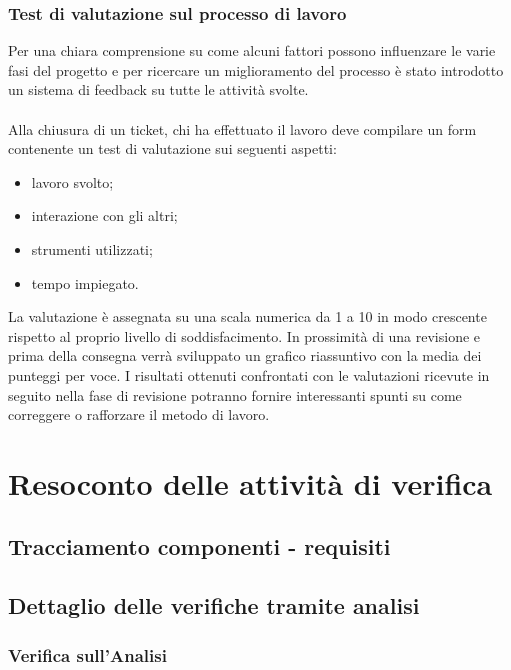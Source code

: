 \subsection{Test di valutazione sul processo di lavoro}
Per una chiara comprensione su come alcuni fattori possono influenzare le varie
fasi del progetto e per ricercare un miglioramento del processo \`e
stato introdotto un sistema di feedback su tutte le attivit\`a svolte.\\ \\
Alla chiusura di un ticket, chi ha effettuato il lavoro deve compilare un form
contenente un test di valutazione sui seguenti aspetti:

\begin{itemize}
\item lavoro svolto;
\item interazione con gli altri;
\item strumenti utilizzati;
\item tempo impiegato.
\end{itemize}

La valutazione \`e assegnata su una scala numerica da 1 a 10 in modo crescente
rispetto al proprio livello di soddisfacimento.
In prossimit\`a di una revisione e prima della consegna verr\`a sviluppato un
grafico riassuntivo con la media dei punteggi per voce. 
I risultati ottenuti confrontati con le valutazioni ricevute in seguito nella
fase di revisione potranno fornire interessanti spunti su come correggere o
rafforzare il metodo di lavoro.




\chapter{Resoconto delle attivit\`a di verifica}
\thispagestyle{fancy} %

\section{Tracciamento componenti - requisiti}

\section{Dettaglio delle verifiche tramite analisi}

\subsection{Verifica sull'Analisi}

